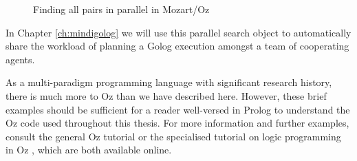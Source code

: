 %
\begin{figure}[!t]

\caption{Finding all pairs in parallel in Mozart/Oz\label{fig:Background:Parallel-All-Pairs}}

\end{figure}


In Chapter \ref{ch:mindigolog} we will use this parallel search object
to automatically share the workload of planning a Golog execution
amongst a team of cooperating agents.

As a multi-paradigm programming language with significant research
history, there is much more to Oz than we have described here. However,
these brief examples should be sufficient for a reader well-versed
in Prolog to understand the Oz code used throughout this thesis. For
more information and further examples, consult the general Oz tutorial
\citep{haridi99oz_tutorial} or the specialised tutorial on logic
programming in Oz \citep{lpinoz99}, which are both available online.

